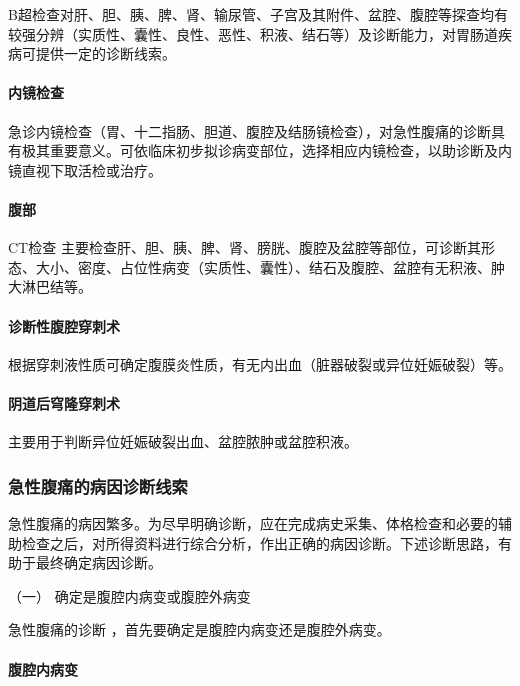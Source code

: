 B超检查对肝、胆、胰、脾、肾、输尿管、子宫及其附件、盆腔、腹腔等探查均有较强分辨（实质性、囊性、良性、恶性、积液、结石等）及诊断能力，对胃肠道疾病可提供一定的诊断线索。

\paragraph{内镜检查}

急诊内镜检查（胃、十二指肠、胆道、腹腔及结肠镜检查），对急性腹痛的诊断具有极其重要意义。可依临床初步拟诊病变部位，选择相应内镜检查，以助诊断及内镜直视下取活检或治疗。

\paragraph{腹部}

CT检查
主要检查肝、胆、胰、脾、肾、膀胱、腹腔及盆腔等部位，可诊断其形态、大小、密度、占位性病变（实质性、囊性）、结石及腹腔、盆腔有无积液、肿大淋巴结等。

\paragraph{诊断性腹腔穿刺术}

根据穿刺液性质可确定腹膜炎性质，有无内出血（脏器破裂或异位妊娠破裂）等。

\paragraph{阴道后穹隆穿刺术}

主要用于判断异位妊娠破裂出血、盆腔脓肿或盆腔积液。

\subsubsection{急性腹痛的病因诊断线索}

急性腹痛的病因繁多。为尽早明确诊断，应在完成病史采集、体格检查和必要的辅助检查之后，对所得资料进行综合分析，作出正确的病因诊断。下述诊断思路，有助于最终确定病因诊断。

\hypertarget{text00026.htmlux5cux23CHP1-10-2-3-1}{}
（一） 确定是腹腔内病变或腹腔外病变

急性腹痛的诊断 ，首先要确定是腹腔内病变还是腹腔外病变。

\paragraph{腹腔内病变}

